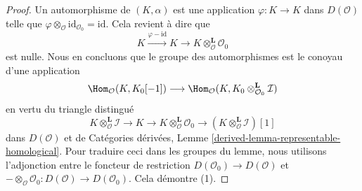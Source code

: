 \begin{proof}
Un automorphisme de $(K, \alpha)$ est une application
$\varphi : K \to K$ dans $D(\mathcal{O})$ telle que
$\varphi \otimes_\mathcal{O} \text{id}_{\mathcal{O}_0} = \text{id}$.
Cela revient à dire que
$$
K \xrightarrow{\varphi - \text{id}} K \to
K \otimes_\mathcal{O}^\mathbf{L} \mathcal{O}_0
$$
est nulle. Nous en concluons que le groupe des automorphismes est le conoyau
d'une application
$$
\Hom_\mathcal{O}(K, K_0[-1])
\longrightarrow
\Hom_\mathcal{O}(K, K_0 \otimes_{\mathcal{O}_0}^\mathbf{L} \mathcal{I})
$$
en vertu du triangle distingué
$$
K \otimes_\mathcal{O}^\mathbf{L} \mathcal{I} \to
K \to
K \otimes_\mathcal{O}^\mathbf{L} \mathcal{O}_0 \to
(K \otimes_\mathcal{O}^\mathbf{L} \mathcal{I})[1]
$$
dans $D(\mathcal{O})$ et de Catégories dérivées,
Lemme \ref{derived-lemma-representable-homological}.
Pour traduire ceci dans les groupes du lemme, nous utilisons l'adjonction entre
le foncteur de restriction $D(\mathcal{O}_0) \to D(\mathcal{O})$ et
$- \otimes_\mathcal{O} \mathcal{O}_0 : D(\mathcal{O}) \to D(\mathcal{O}_0)$.
Cela démontre (1).


\end{proof}
